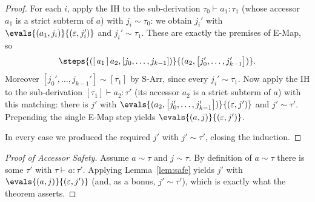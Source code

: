 \documentclass[11pt]{article}
\newcommand{\jarr}[1]{\left[#1\right]}   %
\newcommand{\matches}[2]{{#1}\sim{#2}}   %
\newcommand{\aeps}{\varepsilon}          %
\newcommand{\amap}[2]{[\,{#1}\,]\,{#2}}          %
\newcommand{\valid}[3]{{#1} \vdash {#2} : {#3}}   %
\begin{document}
\begin{proof}
For each $i$, apply the IH to the sub-derivation $\valid{\tau_0}{a_1}{\tau_1}$
(whose accessor $a_1$ is a strict subterm of $a$) with $\matches{j_i}{\tau_0}$:
we obtain $j_i'$ with $\evals{(a_1, j_i)}{(\aeps, j_i')}$ and
$\matches{j_i'}{\tau_1}$. These are exactly the premises of E-Map, so
\[
  \steps{(\amap{a_1}{a_2}, \jarr{j_0, \ldots, j_{k-1}})}
        {(a_2, \jarr{j_0', \ldots, j_{k-1}'})}.
\]
Moreover $\matches{\jarr{j_0', \ldots, j_{k-1}'}}{\jarr{\tau_1}}$ by S-Arr, since
every $\matches{j_i'}{\tau_1}$. Now apply the IH to the sub-derivation
$\valid{\jarr{\tau_1}}{a_2}{\tau'}$ (its accessor $a_2$ is a strict subterm of
$a$) with this matching: there is $j'$ with
$\evals{(a_2, \jarr{j_0', \ldots, j_{k-1}'})}{(\aeps, j')}$ and
$\matches{j'}{\tau'}$. Prepending the single E-Map step yields
$\evals{(a, j)}{(\aeps, j')}$.

In every case we produced the required $j'$ with $\matches{j'}{\tau'}$, closing
the induction.
\end{proof}

\begin{proof}[Proof of Accessor Safety]
Assume $\matches{a}{\tau}$ and $\matches{j}{\tau}$. By definition of
$\matches{a}{\tau}$ there is some $\tau'$ with $\valid{\tau}{a}{\tau'}$. Applying
Lemma~\ref{lem:safe} yields $j'$ with $\evals{(a, j)}{(\aeps, j')}$ (and, as a
bonus, $\matches{j'}{\tau'}$), which is exactly what the theorem asserts.
\end{proof}
\end{document}
